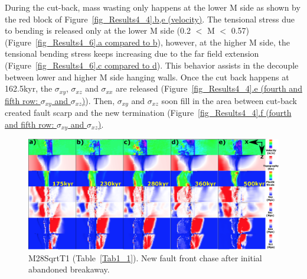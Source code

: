 During the cut-back, mass wasting only happens at the lower M side as shown by the red block of Figure~\hyperref[fig_Results4_4]{\ref{fig_Results4_4}.b,e (velocity)}. The tensional stress due to bending is released only at the lower M side (0.2 $<$ M $<$ 0.57) (Figure~\hyperref[fig_Results4_6]{\ref{fig_Results4_6}.a compared to b}), however, at the higher M side, the tensional bending stress keeps increasing due to the far field extension (Figure~\hyperref[fig_Results4_6]{\ref{fig_Results4_6}.c compared to d}). This behavior assists in the decouple between lower and higher M side hanging walls. Once the cut back happens at 162.5kyr, the $\sigma_{xy}$, $\sigma_{xz}$ and $\sigma_{xx}$ are released (Figure~\hyperref[fig_Results4_4]{\ref{fig_Results4_4}.e (fourth and fifth row: $\sigma_{xy}$ and $\sigma_{xz}$)}). %
Then, $\sigma_{xy}$ and $\sigma_{xz}$ soon fill in the area between cut-back created fault scarp and the new termination (Figure~\hyperref[fig_Results4_4]{\ref{fig_Results4_4}.f (fourth and fifth row: $\sigma_{xy}$ and $\sigma_{xz}$)}.%

\begin{figure}[h]
  \centering
    \includegraphics[width=1.0\textwidth]{./Figures/fig_Results4_9_sqrt_cut_back_new_fault_chase.eps}
  \caption{M28SqrtT1 (Table~\hyperref[Tab1_1]{\ref{Tab1_1}}). New fault front chase after initial abandoned breakaway.}
 \label{fig_Results4_9}
\end{figure}

